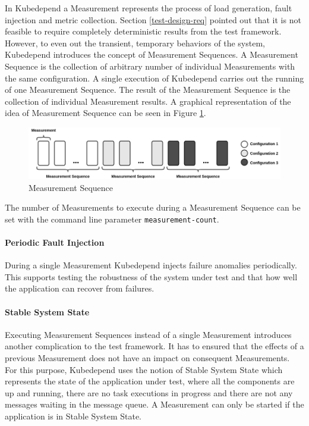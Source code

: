 In Kubedepend a Measurement represents the process of load generation, fault injection and metric collection. Section \ref{test-design-req} pointed out that it is not feasible to require completely deterministic results from the test framework. However, to even out the transient, temporary behaviors of the system, Kubedepend introduces the concept of Measurement Sequences. A Measurement Sequence is the collection of arbitrary number of individual Measurements with the same configuration. A single execution of Kubedepend carries out the running of one Measurement Sequence. The result of the Measurement Sequence is the collection of individual Measurement results. A graphical representation of the idea of Measurement Sequence can be seen in Figure \ref{fig:measurement_sequence}.

\begin{figure}[h]
	\centering
	\includegraphics[width=140mm, keepaspectratio]{figures/measurement_sequence.png}
	\caption{Measurement Sequence}
	\label{fig:measurement_sequence}
\end{figure}

The number of Measurements to execute during a Measurement Sequence can be set with the command line parameter \texttt{measurement-count}.




\paragraph{Periodic Fault Injection} During a single Measurement Kubedepend injects failure anomalies periodically. This supports testing the robustness of the system under test and that how well the application can recover from failures.

\paragraph{Stable System State} Executing Measurement Sequences instead of a single Measurement introduces another complication to the test framework. It has to ensured that the effects of a previous Measurement does not have an impact on consequent Measurements. For this purpose, Kubedepend uses the notion of Stable System State which represents the state of the application under test, where all the components are up and running, there are no task executions in progress and there are not any messages waiting in the message queue. A Measurement can only be started if the application is in Stable System State.

